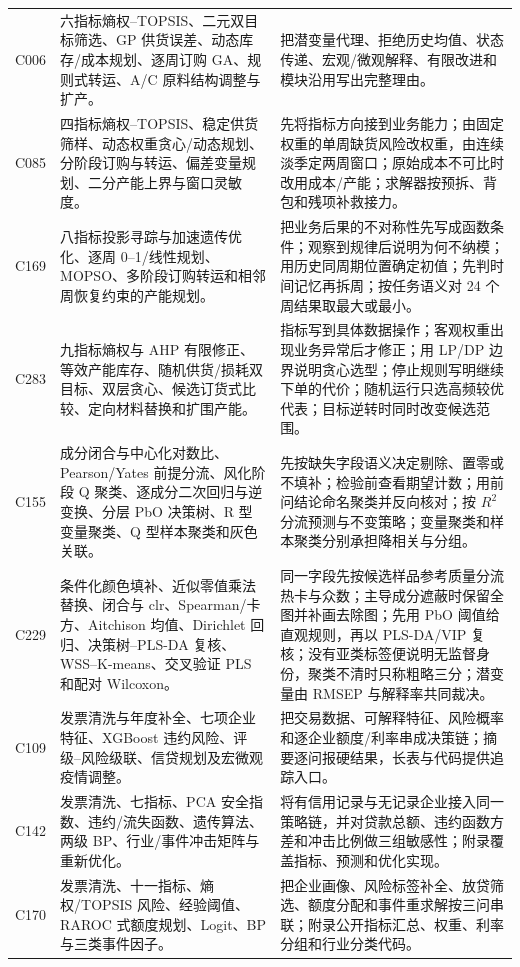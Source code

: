 \documentclass[UTF8,a4paper,12pt]{ctexart}
\begin{document}
\begin{longtable}{p{1.4cm}p{5.2cm}p{7.0cm}}
C006 & 六指标熵权--TOPSIS、二元双目标筛选、GP 供货误差、动态库存/成本规划、逐周订购 GA、规则式转运、A/C 原料结构调整与扩产。 &
把潜变量代理、拒绝历史均值、状态传递、宏观/微观解释、有限改进和模块沿用写出完整理由。\\
C085 & 四指标熵权--TOPSIS、稳定供货筛样、动态权重贪心/动态规划、分阶段订购与转运、偏差变量规划、二分产能上界与窗口灵敏度。 &
先将指标方向接到业务能力；由固定权重的单周缺货风险改权重，由连续淡季定两周窗口；原始成本不可比时改用成本/产能；求解器按预拆、背包和残项补救接力。\\
C169 & 八指标投影寻踪与加速遗传优化、逐周 0--1/线性规划、MOPSO、多阶段订购转运和相邻周恢复约束的产能规划。 &
把业务后果的不对称性先写成函数条件；观察到规律后说明为何不纳模；用历史同周期位置确定初值；先判时间记忆再拆周；按任务语义对 24 个周结果取最大或最小。\\
C283 & 九指标熵权与 AHP 有限修正、等效产能库存、随机供货/损耗双目标、双层贪心、候选订货式比较、定向材料替换和扩围产能。 &
指标写到具体数据操作；客观权重出现业务异常后才修正；用 LP/DP 边界说明贪心选型；停止规则写明继续下单的代价；随机运行只选高频较优代表；目标逆转时同时改变候选范围。\\
C155 & 成分闭合与中心化对数比、Pearson/Yates 前提分流、风化阶段 Q 聚类、逐成分二次回归与逆变换、分层 PbO 决策树、R 型变量聚类、Q 型样本聚类和灰色关联。 &
先按缺失字段语义决定剔除、置零或不填补；检验前查看期望计数；用前问结论命名聚类并反向核对；按 $R^2$ 分流预测与不变策略；变量聚类和样本聚类分别承担降相关与分组。\\
C229 & 条件化颜色填补、近似零值乘法替换、闭合与 clr、Spearman/卡方、Aitchison 均值、Dirichlet 回归、决策树--PLS-DA 复核、WSS--K-means、交叉验证 PLS 和配对 Wilcoxon。 &
同一字段先按候选样品参考质量分流热卡与众数；主导成分遮蔽时保留全图并补画去除图；先用 PbO 阈值给直观规则，再以 PLS-DA/VIP 复核；没有亚类标签便说明无监督身份，聚类不清时只称粗略三分；潜变量由 RMSEP 与解释率共同裁决。\\
C109 & 发票清洗与年度补全、七项企业特征、XGBoost 违约风险、评级--风险级联、信贷规划及宏微观疫情调整。 &
把交易数据、可解释特征、风险概率和逐企业额度/利率串成决策链；摘要逐问报硬结果，长表与代码提供追踪入口。\\
C142 & 发票清洗、七指标、PCA 安全指数、违约/流失函数、遗传算法、两级 BP、行业/事件冲击矩阵与重新优化。 &
将有信用记录与无记录企业接入同一策略链，并对贷款总额、违约函数方差和冲击比例做三组敏感性；附录覆盖指标、预测和优化实现。\\
C170 & 发票清洗、十一指标、熵权/TOPSIS 风险、经验阈值、RAROC 式额度规划、Logit、BP 与三类事件因子。 &
把企业画像、风险标签补全、放贷筛选、额度分配和事件重求解按三问串联；附录公开指标汇总、权重、利率分组和行业分类代码。\\

\end{longtable}
\end{document}
